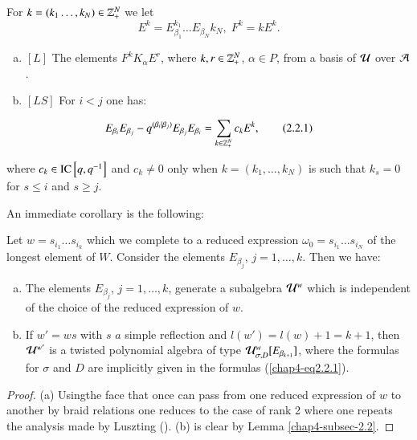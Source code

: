 For $k=(k_{1}\ldots, k_{N})\in \mathbb{Z}_{+}^{N}$ we let
$$
E^{k}=E_{\beta_{1}}^{k_{1}}\ldots E_{\beta_{N}}^{}k_{N}, \; F^{k}= kE^{k}.
$$

\begin{lemma*}
\begin{enumerate}[(a)]
\item $[L]$ The elements $F^{k}K_{\alpha}E^{r}$, where $k,r \in \mathbb{Z}_{+}^{N}$, $\alpha \in P$, from a basis of $\mathcal{U}$ over $\mathcal{A}$.\label{chap4-enumL-(a)}
\item $[LS]$ For $i < j$ one has: \label{chap4-enumL-(b)}
\end{enumerate}
\begin{equation*}
E_{\beta_{i}}E_{\beta_{j}}- q^{(\beta_{i} | \beta_{j})} E_{\beta_{j}}E_{\beta_{i}} =\sum\limits_{k\in\mathbb{Z}_{+}^{N}}c_{k}E^{k},\tag{2.2.1}\label{chap4-eq2.2.1}
\end{equation*}
\end{lemma*}

\noindent
where $c_{k}\in \operatorname{IC} \left[q, q^{-1}\right]$ and $c_{k} \neq 0$ only when $k=(k_{1}, \ldots, k_{N})$ is such that $k_{s} =0 $ for $s\leq i$ and $s\geq j$.

An immediate corollary is the following:

Let $w = s_{i_{1}}\ldots s_{i_{k}}$ which we complete to a reduced expression $\omega_{0} = s_{i_{1}}\ldots s_{i_{N}}$ of the longest element of $W$. Consider the elements $E_{\beta_{j}}$, $j = 1, \ldots, k$. Then we have:

\begin{prop*}
\begin{enumerate}[(a)]
\item The elements $E_{\beta_{j}}$, $j=1, \ldots, k$, generate a subalgebra $\mathcal{U}^{w}$ which is independent of the choice of the reduced expression of $w$.\label{art-enum-p-(a)}
\item If $w' = w s$ with $s$ $a$ simple reflection and $l(w') = l(w) +1 = k+1$, then $\mathcal{U}^{w'}$ is a twisted polynomial algebra of type $\mathcal{U}_{\sigma, D}^{w}[E_{\beta_{k+1}}]$, where the formulas for $\sigma$ and $D$ are implicitly given in the formulas (\ref{chap4-eq2.2.1}).\label{art-enum-p-(b)}
\end{enumerate}
\end{prop*}

\begin{proof}
(a) Using\pageoriginale the face that once can pass from one reduced expression of $w$ to another by braid relations one reduces to the case of rank 2 where one repeats the analysis made by Luszting (\cite{chap4-keyL}). (b) is clear by Lemma \ref{chap4-subsec-2.2}. 
\end{proof}

